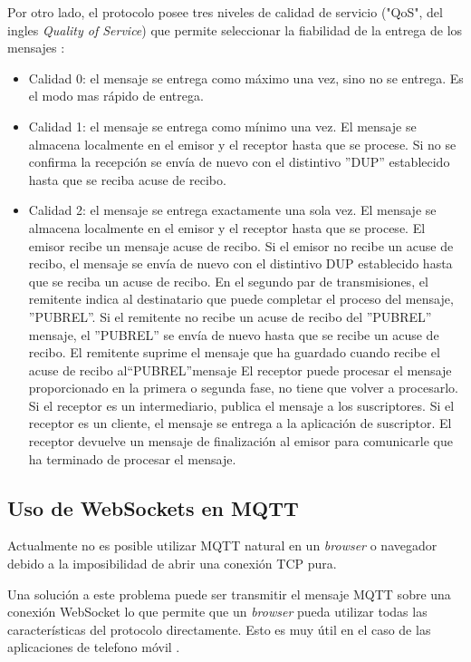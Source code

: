 Por otro lado, el protocolo posee tres niveles de calidad de servicio ("QoS", del ingles \textit{Quality of Service}) que permite seleccionar la fiabilidad de la entrega de los mensajes \citep{WEBSITE:5}\citep{WEBSITE:28} :

\begin{itemize}
\item Calidad 0: el mensaje se entrega como máximo una vez, sino no se entrega. Es el modo mas rápido de entrega.
\item Calidad 1: el mensaje se entrega como mínimo una vez. El mensaje se almacena localmente en el emisor y el receptor hasta que se procese. Si no se confirma la recepción se envía de nuevo con el distintivo ''DUP'' establecido hasta que se reciba acuse de recibo.
\item Calidad 2: el mensaje se entrega exactamente una sola vez. El mensaje se almacena localmente en el emisor y el receptor hasta que se procese. El emisor recibe un mensaje acuse de recibo. Si el emisor no recibe un acuse de recibo, el mensaje se envía de nuevo con el distintivo DUP establecido hasta que se reciba un acuse de recibo.
En el segundo par de transmisiones, el remitente indica al destinatario que puede completar el proceso del mensaje, ''PUBREL''. Si el remitente no recibe un acuse de recibo del ''PUBREL'' mensaje, el ''PUBREL'' se envía de nuevo hasta que se recibe un acuse de recibo. El remitente suprime el mensaje que ha guardado cuando recibe el acuse de recibo al“PUBREL”mensaje
El receptor puede procesar el mensaje proporcionado en la primera o segunda fase, no tiene que volver a procesarlo. Si el receptor es un intermediario, publica el mensaje a los suscriptores. Si el receptor es un cliente, el mensaje se entrega a la aplicación de suscriptor. El receptor devuelve un mensaje de finalización al emisor para comunicarle que ha terminado de procesar el mensaje.

\end{itemize}


\label{subsec:WebSockets}
\subsection{Uso de WebSockets en MQTT}

Actualmente no es posible utilizar MQTT natural en un \textit{browser} o navegador debido a la imposibilidad de abrir una conexión TCP pura. 

Una solución a este problema puede ser transmitir el mensaje MQTT sobre una conexión WebSocket lo que permite que un \textit{browser} pueda utilizar todas las características del protocolo directamente. Esto es muy útil en el caso de las aplicaciones de telefono móvil \citep{WEBSITE:6}. 


